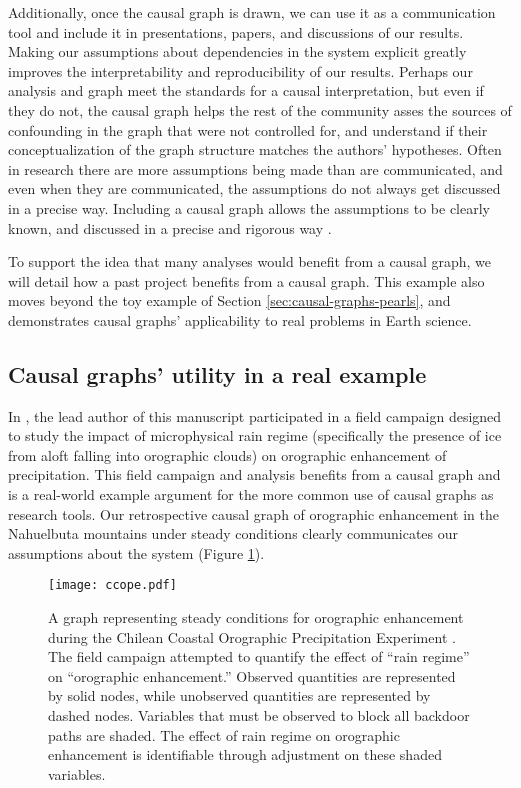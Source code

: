 \documentclass[12pt]{article}
\begin{document}
Additionally, once the causal graph is drawn, we can use it as a
communication tool and include it in presentations, papers, and
discussions of our results. Making our assumptions about dependencies
in the system explicit greatly improves the interpretability and
reproducibility of our results. Perhaps our analysis and graph meet
the standards for a causal interpretation, but even if they do not,
the causal graph helps the rest of the community asses the sources of
confounding in the graph that were not controlled for, and understand
if their conceptualization of the graph structure matches the authors'
hypotheses. Often in research there are more assumptions being made
than are communicated, and even when they are communicated, the
assumptions do not always get discussed in a precise way. Including a
causal graph allows the assumptions to be clearly known, and discussed
in a precise and rigorous way \citep[e.g.,][]{hannart-da}.

To support the idea that many analyses would benefit from a causal
graph, we will detail how a past project benefits from a causal
graph. This example also moves beyond the toy example of Section
\ref{sec:causal-graphs-pearls}, and demonstrates causal graphs'
applicability to real problems in Earth science.

\subsection{Causal graphs' utility in a real example}

In \citet{massmann2017}, the lead author of this manuscript
participated in a field campaign designed to study the impact of
microphysical rain regime (specifically the presence of ice from aloft
falling into orographic clouds) on orographic enhancement of
precipitation. This field campaign and analysis benefits from a causal
graph and is a real-world example argument for the more common use of
causal graphs as research tools. Our retrospective causal graph of
orographic enhancement in the Nahuelbuta mountains under steady
conditions clearly communicates our assumptions about the system
(Figure \ref{fig:ccope}).

\begin{figure} \texttt{[image: ccope.pdf]}
  \caption{A graph representing steady conditions for orographic
    enhancement during the Chilean Coastal Orographic Precipitation
    Experiment \citep[CCOPE,][]{massmann2017}. The field campaign
    attempted to quantify the effect of ``rain regime'' on
    ``orographic enhancement.''  Observed quantities are represented
    by solid nodes, while unobserved quantities are represented by
    dashed nodes. Variables that must be observed to block all
    backdoor paths are shaded. The effect of rain regime on orographic
    enhancement is identifiable through adjustment on these shaded variables.}
  \label{fig:ccope}
\end{figure}
\end{document}
